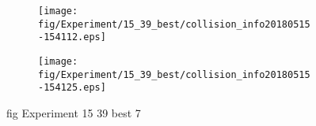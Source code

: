 \begin{figure}[H]
	\centering
	\begin{subfigure}[b]{0.9\textwidth}
		\texttt{[image: fig/Experiment/15\_39\_best/collision\_info20180515-154112.eps]}
		\caption{}
		\label{fig:Experiment:15_39_best:collision_info20180515-154112}
	\end{subfigure}

	\begin{subfigure}[b]{0.9\textwidth}
		\texttt{[image: fig/Experiment/15\_39\_best/collision\_info20180515-154125.eps]}
		\caption{}
		\label{fig:Experiment:15_39_best:collision_info20180515-154125}
	\end{subfigure}
	\caption{fig Experiment 15 39 best 7}
	\label{fig:Experiment:15_39_best:7}
\end{figure}

